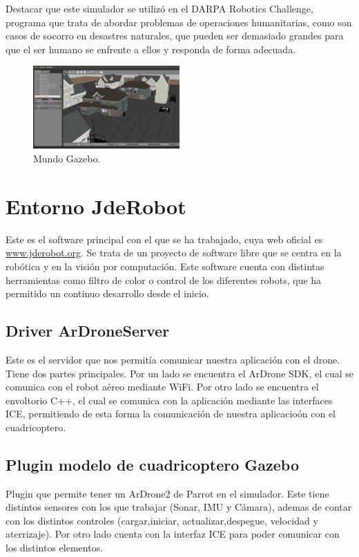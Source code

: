 \hspace{1 cm} Destacar que este simulador se utiliz\'o en el DARPA Robotics Challenge, programa que trata de abordar problemas de operaciones humanitarias, como son casos de socorro en desastres naturales, que pueden ser demasiado grandes para que el ser humano se enfrente a ellos y responda de forma adecuada.

\begin{figure}[H]
	\centering
		\includegraphics[width=0.5\textwidth]{imgs/gazeboworld.png}
				\caption{Mundo Gazebo.}
	\label{fig:MundoGazebo}
\end{figure}

\section{Entorno JdeRobot}
\hspace{1 cm} Este es el software principal con el que se ha trabajado, cuya web oficial es \underline{\url{www.jderobot.org}}. Se trata de un proyecto de software libre que se centra en la rob\'otica y en la visi\'on por computaci\'on. Este software cuenta con distintas herramientas como filtro de color o control de los diferentes robots, que ha permitido un continuo desarrollo desde el inicio. 


\subsection{Driver ArDroneServer}
\hspace{1 cm} Este es el servidor que nos permit\'ia comunicar nuestra aplicaci\'on con el drone. Tiene dos partes principales. Por un lado se encuentra el ArDrone SDK, el cual se comunica con el robot a\'ereo mediante WiFi. Por otro lado se encuentra el envoltorio C++, el cual se comunica con la aplicaci\'on mediante las interfaces ICE, permitiendo de esta forma la comunicaci\'on de nuestra aplicacio\'on con el cuadricoptero. 

\subsection{Plugin modelo de cuadricoptero Gazebo}
\hspace{1 cm} Plugin que permite tener un ArDrone2 de Parrot en el simulador. Este tiene distintos sensores con los que trabajar (Sonar, IMU y C\'amara), ademas de contar con los distintos controles (cargar,iniciar, actualizar,despegue, velocidad y aterrizaje). Por otro lado cuenta con la interfaz ICE para poder comunicar con los distintos elementos. 




